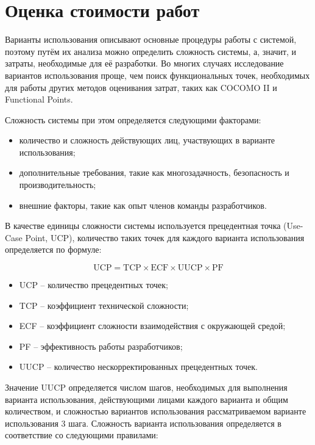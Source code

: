 \documentclass[14pt,russian]{extarticle}
\begin{document}
\clearpage
\section{Оценка стоимости работ}

Варианты использования описывают основные процедуры работы с системой, поэтому
путём их анализа можно определить сложность системы, а, значит, и затраты,
необходимые для её разработки. Во многих случаях исследование вариантов
использования проще, чем поиск функциональных точек, необходимых для работы
других методов оценивания затрат, таких как COCOMO II и Functional Points.

Сложность системы при этом определяется следующими факторами:

\begin{itemize}
	\item количество и сложность действующих лиц, участвующих в варианте использования;

	\item дополнительные требования, такие как многозадачность, безопасность и
		производительность;

	\item внешние факторы, такие как опыт членов команды разработчиков.
\end{itemize}

В качестве единицы сложности системы используется прецедентная точка (Use-Case
Point, UCP), количество таких точек для каждого варианта использования
определяется по формуле:

\begin{equation}
	\mathrm{UCP} = \mathrm{TCP} \times \mathrm{ECF} \times \mathrm{UUCP} \times \mathrm{PF}
\end{equation}

\begin{itemize}
	\item UCP – количество прецедентных точек;
	\item TCP – коэффициент технической сложности;
	\item ECF – коэффициент сложности взаимодействия с окружающей средой;
	\item PF – эффективность работы разработчиков;
	\item UUCP – количество нескорректированных прецедентных точек.
\end{itemize}

Значение UUCP определяется числом шагов, необходимых для выполнения варианта
использования, действующими лицами каждого варианта и общим количеством, и
сложностью вариантов использования рассматриваемом варианте использования 3
шага. Сложность варианта использования определяется в соответствие со следующими
правилами:
\end{document}
